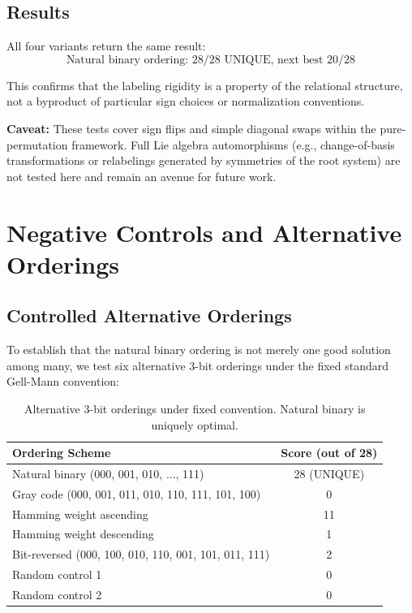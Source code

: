 \documentclass[11pt,a4paper]{article}
\begin{document}
\subsection{Results}

All four variants return the same result:
\begin{equation}
\text{Natural binary ordering: } 28/28 \text{ UNIQUE, next best } 20/28
\end{equation}

This confirms that the labeling rigidity is a property of the relational structure, not a byproduct of particular sign choices or normalization conventions.

\textbf{Caveat:} These tests cover sign flips and simple diagonal swaps within the pure-permutation framework. Full Lie algebra automorphisms (e.g., change-of-basis transformations or relabelings generated by symmetries of the root system) are not tested here and remain an avenue for future work.

\section{Negative Controls and Alternative Orderings}\label{sec:negcontrols}

\subsection{Controlled Alternative Orderings}

To establish that the natural binary ordering is not merely one good solution among many, we test six alternative 3-bit orderings under the fixed standard Gell-Mann convention:

\begin{table}[h]
\centering
\begin{tabular}{|l|c|}
\hline
Ordering Scheme & Score (out of 28) \\
\hline
Natural binary (000, 001, 010, ..., 111) & 28 (UNIQUE) \\
Gray code (000, 001, 011, 010, 110, 111, 101, 100) & 0 \\
Hamming weight ascending & 11 \\
Hamming weight descending & 1 \\
Bit-reversed (000, 100, 010, 110, 001, 101, 011, 111) & 2 \\
Random control 1 & 0 \\
Random control 2 & 0 \\
\hline
\end{tabular}
\caption{Alternative 3-bit orderings under fixed convention. Natural binary is uniquely optimal.}
\label{tbl:negcontrols}
\end{table}
\end{document}
